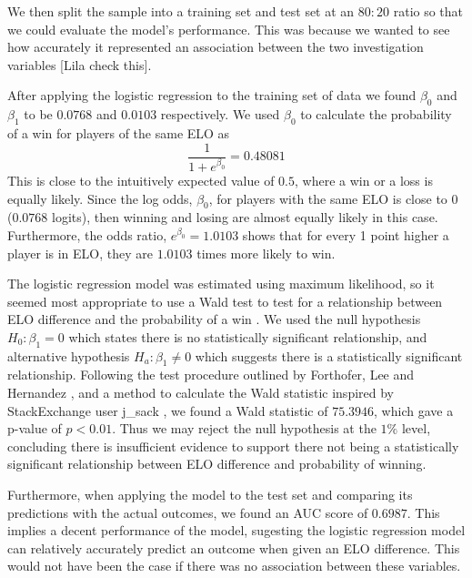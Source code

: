 \documentclass[10pt,a4paper,twocolumn]{article}
\begin{document}
We then split the sample into a training set and test set at an $80:20$ ratio so that we could evaluate the model's performance. This was because we wanted to see how accurately it represented an association between the two investigation variables [Lila check this].

After applying the logistic regression to the training set of data we found $\beta_{0}$ and $\beta_{1}$ to be $0.0768$ and $0.0103$ respectively. We used $\beta_{0}$ to calculate the probability of a win for players of the same ELO as 
$$\displaystyle\frac{1}{1+e^{\beta_{0}}} = 0.48081$$
This is close to the intuitively expected value of $0.5$, where a win or a loss is equally likely. Since the log odds, $\beta_{0}$, for players with the same ELO is close to $0$ ($0.0768$ logits), then winning and losing are almost equally likely in this case. Furthermore, the odds ratio, $e^{\beta_{0}} = 1.0103$ shows that for every 1 point higher a player is in ELO, they are $1.0103$ times more likely to win. \newline

The logistic regression model was estimated using maximum likelihood, so it seemed most appropriate to use a Wald test to test for a relationship between ELO difference and the probability of a win \cite{WaldTest}. We used the null hypothesis $H_{0}: \beta_{1} = 0$ which states there is no statistically significant relationship, and alternative hypothesis $H_{a}: \beta_{1} \neq 0$ which suggests there is a statistically significant relationship. Following the test procedure outlined by Forthofer, Lee and Hernandez \cite{WaldTest}, and a method to calculate the Wald statistic inspired by StackExchange user j\_sack \cite{StackExchangeWaldTest}, we found a Wald statistic of $75.3946$, which gave a p-value of $p<0.01$. Thus we may reject the null hypothesis at the $1\%$ level, concluding there is insufficient evidence to support there not being a statistically significant relationship between ELO difference and probability of winning. \newline

Furthermore, when applying the model to the test set and comparing its predictions with the actual outcomes, we found an AUC score of $0.6987$. This implies a decent performance of the model, sugesting the logistic regression model can relatively accurately predict an outcome when given an ELO difference. This would not have been the case if there was no association between these variables. \newline
\end{document}

